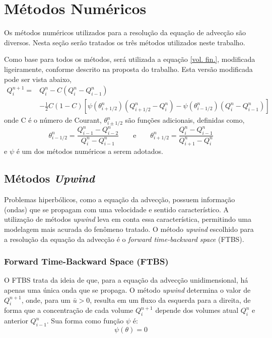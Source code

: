 \section{Métodos Numéricos}
Os métodos numéricos utilizados para a resolução da equação de advecção são
diversos. Nesta seção serão tratados os três métodos utilizados neste trabalho.

Como base para todos os métodos, será utilizada a equação \ref{vol. fin.},
modificada ligeiramente, conforme descrito na proposta do trabalho. Esta versão
modificada pode ser vista abaixo,
\begin{equation}
\begin{split}
    Q_i^{n+1} = {} & Q_i^n - C \left( Q_i^n - Q_{i-1}^n \right) \\
                   & - \frac{1}{2}C(1-C)
    \left[
        \psi \left( \theta_{i+1/2}^n \right) \left( Q_{i+1/2}^n-Q_i^n \right)
        - \psi \left( \theta_{i-1/2}^n \right) \left(Q_i^n - Q_{i-1}^n \right)
    \right]
\end{split}
\end{equation}
onde C é o número de Courant, $\theta_{i\pm1/2}^n$ são funções adicionais,
definidas como,
\[
    \theta_{i-1/2}^n = \frac{Q_{i-1}^n - Q_{i-2}^n}{Q_i^n - Q_{i-1}^n}
    \qquad
    \text{e}
    \qquad
    \theta_{i+1/2}^n = \frac{Q_i^n - Q_{i-1}^n}{Q_{i+1}^n - Q_i^n}
\]
e $\psi$ é um dos métodos numéricos a serem adotados.

\subsection{Métodos \textit{Upwind}}
Problemas hiperbólicos, como a equação da advecção, possuem informação (ondas)
que se propagam com uma velocidade e sentido característico. A utilização de
métodos \textit{upwind} leva em conta essa característica, permitindo uma
modelagem mais acurada do fenômeno tratado. O método \textit{upwind} escolhido
para a resolução da equação da advecção é o \textit{forward time-backward space}
(FTBS).

\subsubsection{Forward Time-Backward Space (FTBS)}
O FTBS trata da ideia de que, para a equação da advecção unidimensional, há
apenas uma única onda que se propaga. O método \textit{upwind} determina o
valor de $Q_i^{n+1}$, onde, para um $\bar{u} > 0$, resulta em um fluxo da
esquerda para a direita, de forma que a concentração de cada volume $Q_i^{n+1}$
depende dos volumes atual $Q_i^n$ e anterior $Q_{i-1}^n$. Sua forma como função
$\psi$ é:
\begin{equation}\label{FTBS}
    \psi(\theta) = 0
\end{equation}

